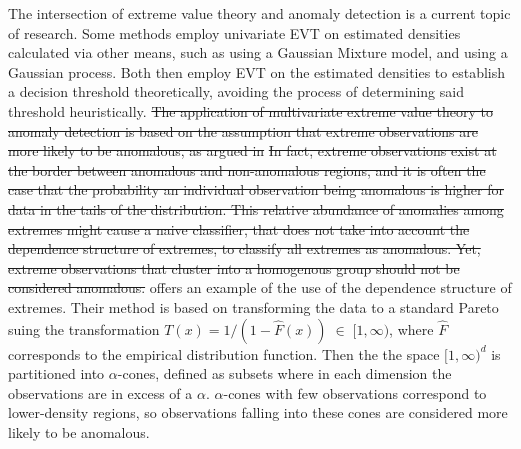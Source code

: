 The intersection of extreme value theory and anomaly detection is a current 
    topic of research.  Some methods employ univariate EVT on estimated 
    densities calculated via other means, such as \cite{clifton2011} using a 
    Gaussian Mixture model, and \cite{gu2021} using a Gaussian process.  Both 
    then employ EVT on the estimated densities to establish a decision 
    threshold theoretically, avoiding the process of determining said
    threshold heuristically.
\st{The application of multivariate extreme value theory to anomaly detection is 
    based on the  assumption that extreme observations are more likely to be 
    anomalous, as argued in }\st{In fact, extreme observations 
    exist at the border between anomalous and non-anomalous regions, and it is 
    often the case that the probability an individual observation being 
    anomalous is higher for data in the tails of the distribution.
    This relative abundance of anomalies among extremes might cause a naive 
    classifier, that does not take into account the dependence structure of 
    extremes, to classify all extremes as anomalous. Yet, extreme observations 
    that cluster into a homogenous group should not be considered anomalous.}
    \cite{goix2017} offers an example of the use of the dependence structure 
    of extremes. Their method is based on transforming the data to a standard 
    Pareto suing the transformation  $T(x) = 1/(1 - \hat{F}(x))\;\in\;[1,\infty)$, 
    where $\hat{F}$ corresponds  to the empirical distribution function. Then the 
    the space $[1,\infty)^d$ is partitioned into $\alpha$-cones, defined as 
    subsets where in each dimension the observations are in excess of a $\alpha$.
    $\alpha$-cones with few observations correspond to lower-density regions, so 
    observations  falling into these cones are considered more likely to be anomalous.

